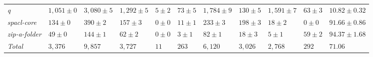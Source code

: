 \begin{table}
{\begin{tabular}[t]{lllllllllll}
\textit{q} & $1,051 \pm 0$ & $3,080 \pm 5$ & $1,292 \pm 5$ & $5 \pm 2$ & $73 \pm 5$ & $1,784 \pm 9$ & $130 \pm 5$ & $1,591 \pm 7$ & $63 \pm 3$ & $10.82 \pm 0.32$\\
\textit{spacl-core} & $134 \pm 0$ & $390 \pm 2$ & $157 \pm 3$ & $0 \pm 0$ & $11 \pm 1$ & $233 \pm 3$ & $198 \pm 3$ & $18 \pm 2$ & $0 \pm 0$ & $91.66 \pm 0.86$\\
\textit{zip-a-folder} & $49 \pm 0$ & $144 \pm 1$ & $62 \pm 2$ & $0 \pm 0$ & $3 \pm 1$ & $82 \pm 1$ & $18 \pm 3$ & $5 \pm 1$ & $59 \pm 2$ & $94.37 \pm 1.68$\\
\hline\textit{Total} & $3,376$ & $9,857$ & $3,727$ & $11$ & $263$ & $6,120$ & $3,026$ & $2,768$ & $292$ & $71.06$\\
\bottomrule
\end{tabular}}
\end{table}
